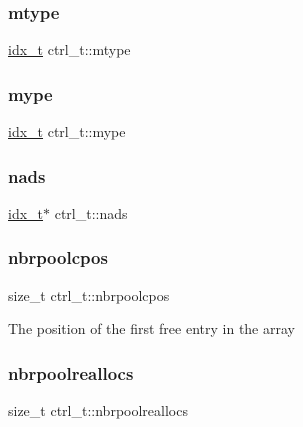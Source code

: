 \mbox{\label{a00742_a596b7ef429ea148e6e8a90b4a5512e95}} 
\subsubsection{\texorpdfstring{mtype}{mtype}}
{\footnotesize\ttfamily \hyperlink{a00876_aaa5262be3e700770163401acb0150f52}{idx\+\_\+t} ctrl\+\_\+t\+::mtype}

\mbox{\label{a00742_a761f99c08049bc91864378dcba5a2385}} 
\subsubsection{\texorpdfstring{mype}{mype}}
{\footnotesize\ttfamily \hyperlink{a00876_aaa5262be3e700770163401acb0150f52}{idx\+\_\+t} ctrl\+\_\+t\+::mype}

\mbox{\label{a00742_a47541c8142aba246ca9b7b003100e9d8}} 
\subsubsection{\texorpdfstring{nads}{nads}}
{\footnotesize\ttfamily \hyperlink{a00876_aaa5262be3e700770163401acb0150f52}{idx\+\_\+t}$\ast$ ctrl\+\_\+t\+::nads}

\mbox{\label{a00742_acafe4ebea8585403e053dc33e7b4ac64}} 
\subsubsection{\texorpdfstring{nbrpoolcpos}{nbrpoolcpos}}
{\footnotesize\ttfamily size\+\_\+t ctrl\+\_\+t\+::nbrpoolcpos}

The position of the first free entry in the array \mbox{\label{a00742_a091baa9be72262dca61c641d1f1e4ad3}} 
\subsubsection{\texorpdfstring{nbrpoolreallocs}{nbrpoolreallocs}}
{\footnotesize\ttfamily size\+\_\+t ctrl\+\_\+t\+::nbrpoolreallocs}

